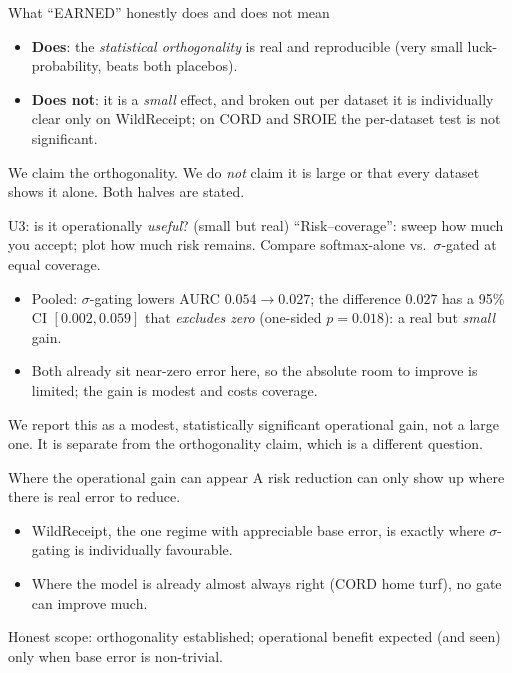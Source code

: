 \documentclass[aspectratio=169]{beamer}
\newcommand{\orthEarned}{EARNED}
\newcommand{\rcAURCsoft}{0.054}
\newcommand{\rcAURCsig}{0.027}
\newcommand{\rcAURCd}{0.027}
\newcommand{\rcAURCdLo}{0.002}
\newcommand{\rcAURCdHi}{0.059}
\newcommand{\rcAURCp}{0.018}
\newcommand{\keybox}[1]{\begin{center}\colorbox{grey!15}{\parbox{0.92\linewidth}{\centering #1}}\end{center}}
\begin{document}
\begin{frame}{What ``\orthEarned'' honestly does and does not mean}
\begin{itemize}
\item \textbf{Does}: the \emph{statistical orthogonality} is real and
reproducible (very small luck-probability, beats both placebos).
\item \textbf{Does not}: it is a \emph{small} effect, and broken out
per dataset it is individually clear only on WildReceipt; on CORD and
SROIE the per-dataset test is not significant.
\end{itemize}
\keybox{We claim the orthogonality. We do \emph{not} claim it is large
or that every dataset shows it alone. Both halves are stated.}
\end{frame}

\begin{frame}{U3: is it operationally \emph{useful}? (small but real)}
``Risk--coverage'': sweep how much you accept; plot how much risk
remains. Compare softmax-alone vs.\ $\sigma$-gated at equal coverage.
\begin{itemize}
\item Pooled: $\sigma$-gating lowers AURC
$\rcAURCsoft\!\to\!\rcAURCsig$; the difference $\rcAURCd$ has a 95\% CI
$[\rcAURCdLo,\rcAURCdHi]$ that \emph{excludes zero} (one-sided
$p=\rcAURCp$): a real but \emph{small} gain.
\item Both already sit near-zero error here, so the absolute room to
improve is limited; the gain is modest and costs coverage.
\end{itemize}
\keybox{We report this as a modest, statistically significant
operational gain, not a large one. It is separate from the
orthogonality claim, which is a different question.}
\end{frame}

\begin{frame}{Where the operational gain can appear}
A risk reduction can only show up where there is real error to
reduce.
\begin{itemize}
\item WildReceipt, the one regime with appreciable base error, is
exactly where $\sigma$-gating is individually favourable.
\item Where the model is already almost always right (CORD home
turf), no gate can improve much.
\end{itemize}
\keybox{Honest scope: orthogonality established; operational benefit
expected (and seen) only when base error is non-trivial.}
\end{frame}
\end{document}
